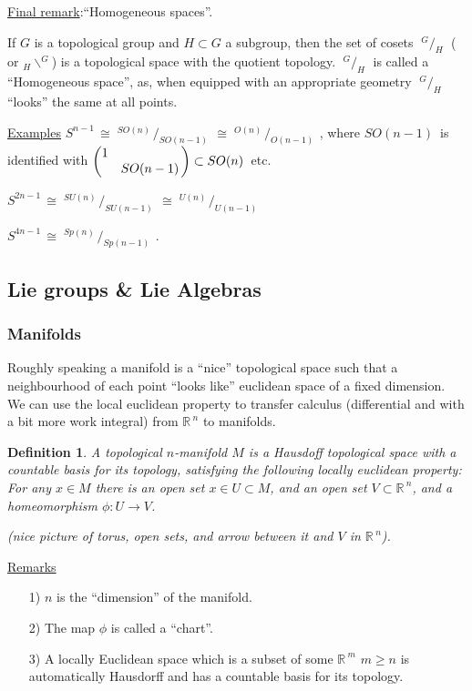 \documentclass[12pt,a4paper]{article}
\newcommand{\rR}{\ensuremath{\mathbb{R}\,}}
\newcommand{\gon}{\ensuremath{O(n)\,}}
\newcommand{\gun}{\ensuremath{U(n)\,}}
\newcommand{\gspn}{\ensuremath{Sp(n)\,}}
\newcommand{\gok}[1]{\ensuremath{O(#1)\,}}
\newcommand{\guk}[1]{\ensuremath{U(#1)\,}}
\newcommand{\gspk}[1]{\ensuremath{Sp(#1)\,}}
\newcommand{\gson}{\ensuremath{SO(n)\,}}
\newcommand{\gsun}{\ensuremath{SU(n)\,}}
\newcommand{\gsok}[1]{\ensuremath{SO(#1)\,}}
\newcommand{\gsuk}[1]{\ensuremath{SU(#1)\,}}
\newcommand{\sph}[1]{\ensuremath{S^{#1}}\,}
\newcommand{\ul}[1]{\underline{#1}}
\newcommand{\quot}[2]{\ensuremath{\;^{#1} / _{#2}\;}}
\newtheorem{defn}[thm]{Definition}
\begin{document}
\ul{Final remark}:``Homogeneous spaces''.

If $G$ is a topological group and $H\subset G$ a subgroup, then the set of cosets $\quot{G}{H}$ ( or $_{H}\backslash ^{G}$) is a topological space with the quotient topology. $\quot{G}{H}$ is called a ``Homogeneous space'', as, when equipped with an appropriate geometry \quot{G}{H} ``looks'' the same at all points.

\ul{Examples} $\sph{n-1}\cong \quot{\gson}{\gsok{n-1}}\cong \quot{\gon}{\gok{n-1}}$, where \gsok{n-1} is identified with $\pmqty{\dmat{1,\gsok{n-1}}}\subset\gson$ etc.

$\sph{2n-1}\cong \quot{\gsun}{\gsuk{n-1}}\cong \quot{\gun}{\guk{n-1}}$

$\sph{4n-1}\cong \quot{\gspn}{\gspk{n-1}}$.

\subsection{Lie groups \& Lie Algebras}

\subsubsection{Manifolds}

Roughly speaking a manifold is a ``nice'' topological space such that a neighbourhood of each point ``looks like'' euclidean space of a fixed dimension. We can use the local euclidean property to transfer calculus (differential and with a bit more work integral) from $\rR^n$ to manifolds.

\begin{defn}
A topological $n$-manifold $M$ is a Hausdoff topological space with a countable basis for its topology, satisfying the following locally euclidean property: For any $x\in M$ there is an open set $x\in U\subset M$, and an open set $V\subset \rR^n$, and a homeomorphism $\phi:U \to V$.

(nice picture of torus, open sets, and arrow between it and $V$ in $\rR^n$).
\end{defn}

\ul{Remarks}
\begin{itemize}
\item[1)] $n$ is the ``dimension'' of the manifold.
\item[2)] The map $\phi$ is called a ``chart''.
\item[3)] A locally Euclidean space  which is a subset of some $\rR^m$ $m\geq n$ is automatically Hausdorff and has a countable basis for its topology.
\end{itemize}
\end{document}
